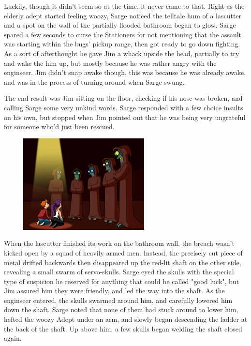 Luckily, though it didn't seem so at the time, it never came to that. 
Right as the elderly adept started feeling woozy, Sarge noticed the telltale hum of a lascutter and a spot on the wall of the partially flooded bathroom began to glow. 
Sarge spared a few seconds to curse the Stationers for not mentioning that the assault was starting within the bugs' pickup range, then got ready to go down fighting. 
As a sort of afterthought he gave Jim a whack upside the head, partially to try and wake the him up, but mostly because he was rather angry with the enginseer. 
Jim didn't snap awake though, this was because he was already awake, and was in the process of turning around when Sarge swung.

The end result was Jim sitting on the floor, checking if his nose was broken, and calling Sarge some very unkind words. 
Sarge responded with a few choice insults on his own, but stopped when Jim pointed out that he was being very ungrateful for someone who'd just been rescued.

\begin{figure}
	\begin{center}
		\includegraphics[width=\figwidth]{pics/14/41.png}
	\end{center}
\end{figure}
When the lascutter finished its work on the bathroom wall, the breach wasn't kicked open by a squad of heavily armed men. 
Instead, the precisely cut piece of metal drifted backwards then disappeared up the red-lit shaft on the other side, revealing a small swarm of servo-skulls. 
Sarge eyed the skulls with the special type of suspicion he reserved for anything that could be called "good luck", but Jim assured him they were friendly, and led the way into the shaft. 
As the enginseer entered, the skulls swarmed around him, and carefully lowered him down the shaft. 
Sarge noted that none of them had stuck around to lower him, hefted the woozy Adept under an arm, and slowly began descending the ladder at the back of the shaft. 
Up above him, a few skulls began welding the shaft closed again.

